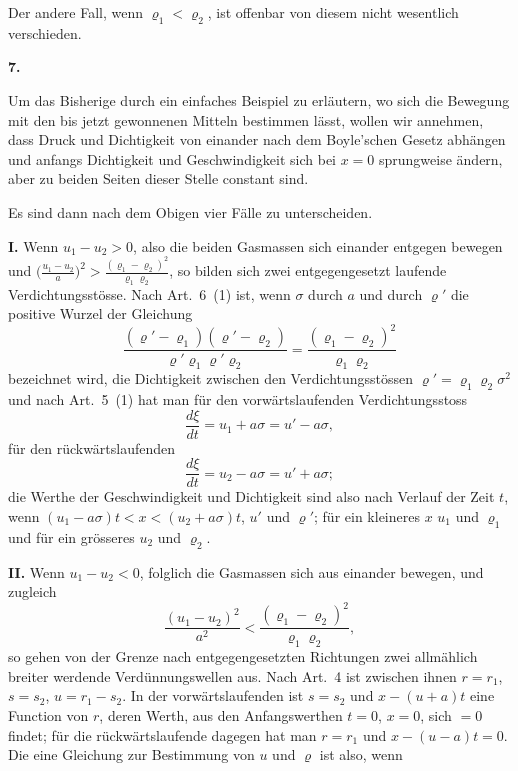 \documentclass[12pt,a4paper]{article}
\begin{document}
Der andere Fall, wenn $\varrho_{1} < \varrho_{2}$, ist offenbar von diesem nicht wesentlich verschieden.

\newpage
\begin{center}
\textbf{7.}
\end{center}

Um das Bisherige durch ein einfaches Beispiel zu erl\"autern, wo sich die Bewegung mit den bis jetzt gewonnenen Mitteln bestimmen l\"asst, wollen wir annehmen, dass Druck und Dichtigkeit von einander nach dem Boyle'schen Gesetz abh\"angen und anfangs Dichtigkeit und Geschwindigkeit sich bei $x = 0$ sprungweise \"andern, aber zu beiden Seiten dieser Stelle constant sind.

Es sind dann nach dem Obigen vier F\"alle zu unterscheiden.

\smallskip
\noindent\textbf{I.} Wenn $u_{1} - u_{2} > 0$, also die beiden Gasmassen sich einander entgegen bewegen und $\bigl(\frac{u_{1} - u_{2}}{a}\bigr)^{2} > \frac{(\varrho_{1} - \varrho_{2})^{2}}{\varrho_{1}\varrho_{2}}$, so bilden sich zwei entgegengesetzt laufende Verdichtungsst\"osse. Nach Art.~6~(1) ist, wenn $\sigma$ durch $a$ und durch $\varrho'$ die positive Wurzel der Gleichung
\[
\frac{(\varrho' - \varrho_{1})(\varrho' - \varrho_{2})}{\varrho'\varrho_{1}\varrho'\varrho_{2}} = \frac{(\varrho_{1} - \varrho_{2})^{2}}{\varrho_{1}\varrho_{2}}
\]
bezeichnet wird, die Dichtigkeit zwischen den Verdichtungsst\"ossen $\varrho' = \varrho_{1}\varrho_{2}\sigma^{2}$ und nach Art.~5~(1) hat man f\"ur den vorw\"artslaufenden Verdichtungsstoss
\[
\frac{d\xi}{dt} = u_{1} + a\sigma = u' - a\sigma,
\]
f\"ur den r\"uckw\"artslaufenden
\[
\frac{d\xi}{dt} = u_{2} - a\sigma = u' + a\sigma;
\]
die Werthe der Geschwindigkeit und Dichtigkeit sind also nach Verlauf der Zeit $t$, wenn $(u_{1} - a\sigma)t < x < (u_{2} + a\sigma)t$, $u'$ und $\varrho'$; f\"ur ein kleineres $x$ $u_{1}$ und $\varrho_{1}$ und f\"ur ein gr\"osseres $u_{2}$ und $\varrho_{2}$.

\smallskip
\noindent\textbf{II.} Wenn $u_{1} - u_{2} < 0$, folglich die Gasmassen sich aus einander bewegen, und zugleich
\[
\frac{(u_{1} - u_{2})^{2}}{a^{2}} < \frac{(\varrho_{1} - \varrho_{2})^{2}}{\varrho_{1}\varrho_{2}},
\]
so gehen von der Grenze nach entgegengesetzten Richtungen zwei allm\"ahlich breiter werdende Verd\"unnungswellen aus. Nach Art.~4 ist zwischen ihnen $r = r_{1}$, $s = s_{2}$, $u = r_{1} - s_{2}$. In der vorw\"artslaufenden ist $s = s_{2}$ und $x - (u + a)t$ eine Function von $r$, deren Werth, aus den Anfangswerthen $t = 0$, $x = 0$, sich $= 0$ findet; f\"ur die r\"uckw\"artslaufende dagegen hat man $r = r_{1}$ und $x - (u - a)t = 0$. Die eine Gleichung zur Bestimmung von $u$ und $\varrho$ ist also, wenn
\end{document}
